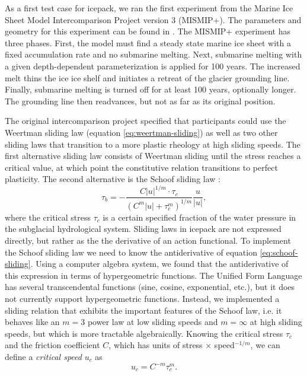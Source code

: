 \documentclass{article}
\theoremstyle{definition}
\theoremstyle{plain}
\begin{document}
As a first test case for icepack, we ran the first experiment from the Marine Ice Sheet Model Intercomparison Project version 3 (MISMIP+).
The parameters and geometry for this experiment can be found in \citet{asay2016experimental}.
The MISMIP+ experiment has three phases.
First, the model must find a steady state marine ice sheet with a fixed accumulation rate and no submarine melting.
Next, submarine melting with a given depth-dependent parameterization is applied for 100 years.
The increased melt thins the ice ice shelf and initiates a retreat of the glacier grounding line.
Finally, submarine melting is turned off for at least 100 years, optionally longer.
The grounding line then readvances, but not as far as its original position.

The original intercomparison project specified that participants could use the Weertman sliding law (equation \eqref{eq:weertman-sliding}) as well as two other sliding laws that transition to a more plastic rheology at high sliding speeds.
The first alternative sliding law consists of Weertman sliding until the stress reaches a critical value, at which point the constitutive relation transitions to perfect plasticity.
The second alternative is the Schoof sliding law \citep{schoof2005effect}:
\begin{equation}
    \tau_b = -\frac{C|u|^{1/m}\cdot \tau_c}{(C^m|u| + \tau_c^m)^{1/m}}\frac{u}{|u|},
    \label{eq:schoof-sliding}
\end{equation}
where the critical stress $\tau_c$ is a certain specified fraction of the water pressure in the subglacial hydrological system.
Sliding laws in icepack are not expressed directly, but rather as the the derivative of an action functional.
To implement the Schoof sliding law we need to know the antiderivative of equation \eqref{eq:schoof-sliding}.
Using a computer algebra system, we found that the antiderivative of this expression in terms of hypergeometric functions.
The Unified Form Language has several transcendental functions (sine, cosine, exponential, etc.), but it does not currently support hypergeometric functions.
Instead, we implemented a sliding relation that exhibits the important features of the Schoof law, i.e. it behaves like an $m = 3$ power law at low sliding speeds and $m = \infty$ at high sliding speeds, but which is more tractable algebraically.
Knowing the critical stress $\tau_c$ and the friction coefficient $C$, which has units of stress $\times$ speed${}^{-1/m}$, we can define a \emph{critical speed} $u_c$ as
\begin{equation}
    u_c = C^{-m}\tau_c^m.
\end{equation}
\end{document}
